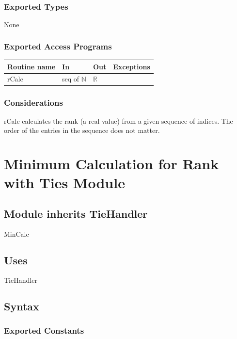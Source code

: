 \documentclass[12pt,fleqn]{examtst}
\begin{document}
\subsubsection* {Exported Types}

None

\subsubsection* {Exported Access Programs}

\begin{tabular}{| l | l | l | p{5cm} |}
\hline
\textbf{Routine name} & \textbf{In} & \textbf{Out} & \textbf{Exceptions}\\
\hline
rCalc & seq of $\mathbb{N}$ & $\mathbb{R}$ & ~\\
\hline
\end{tabular}

\subsubsection* {Considerations}

rCalc calculates the rank (a real value) from a given sequence of indices.
The order of the entries in the sequence does not matter.


\newpage

\section* {Minimum Calculation for Rank with Ties Module}

\subsection*{Module inherits TieHandler}

MinCalc

\subsection* {Uses}

TieHandler

\subsection* {Syntax}

\subsubsection* {Exported Constants}
\end{document}
